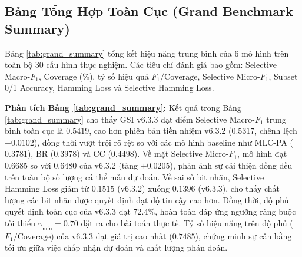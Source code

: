\documentclass[11pt,a4paper]{article}
\begin{document}
\subsection{Bảng Tổng Hợp Toàn Cục (Grand Benchmark Summary)}
Bảng \ref{tab:grand_summary} tổng kết hiệu năng trung bình của 6 mô hình trên toàn bộ 30 cấu hình thực nghiệm. Các tiêu chí đánh giá bao gồm: Selective Macro-$F_1$, Coverage (\%), tỷ số hiệu quả $F_1/\text{Coverage}$, Selective Micro-$F_1$, Subset 0/1 Accuracy, Hamming Loss và Selective Hamming Loss.

\begin{table}[H]
\centering
\caption{Bảng tổng hợp toàn diện hiệu năng đa tiêu chí đối sánh giữa 6 hệ thống mô hình (In đậm kết quả tối ưu).}
\label{tab:grand_summary}
\end{table}

\noindent\textbf{Phân tích Bảng \ref{tab:grand_summary}:}
Kết quả trong Bảng \ref{tab:grand_summary} cho thấy GSI v6.3.3 đạt điểm Selective Macro-$F_1$ trung bình toàn cục là $0.5419$, cao hơn phiên bản tiền nhiệm v6.3.2 ($0.5317$, chênh lệch $+0.0102$), đồng thời vượt trội rõ rệt so với các mô hình baseline như MLC-PA ($0.3781$), BR ($0.3978$) và CC ($0.4498$). Về mặt Selective Micro-$F_1$, mô hình đạt $0.6685$ so với $0.6480$ của v6.3.2 (tăng $+0.0205$), phản ánh sự cải thiện đồng đều trên toàn bộ số lượng cá thể mẫu dự đoán. Về sai số bit nhãn, Selective Hamming Loss giảm từ $0.1515$ (v6.3.2) xuống $0.1396$ (v6.3.3), cho thấy chất lượng các bit nhãn được quyết định đạt độ tin cậy cao hơn. Đồng thời, độ phủ quyết định toàn cục của v6.3.3 đạt $72.4\%$, hoàn toàn đáp ứng ngưỡng ràng buộc tối thiểu $\gamma_{\min} = 0.70$ đặt ra cho bài toán thực tế. Tỷ số hiệu năng trên độ phủ ($F_1/\text{Coverage}$) của v6.3.3 đạt giá trị cao nhất ($0.7485$), chứng minh sự cân bằng tối ưu giữa việc chấp nhận dự đoán và chất lượng phán đoán.
\end{document}
